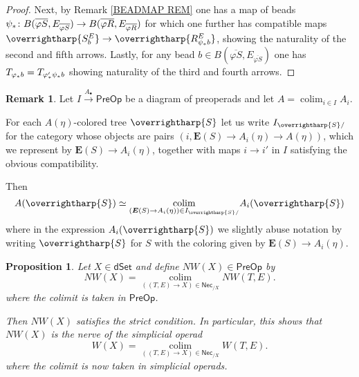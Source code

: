 \documentclass[a4paper,10pt
,draft
]{article}%
\numberwithin{equation}{section}
\numberwithin{figure}{section}
\newtheorem{proposition}[equation]{Proposition}%
\theoremstyle{definition} %
\newtheorem{remark}[equation]{Remark}%
\newcommand{\vect}[1]{\text{\overrightharp{\ensuremath{#1}}}}
\DeclareMathOperator{\colim}{colim}%
\newcommand{\1}{\ensuremath{\mathbbm 1}}%
\begin{document}
\begin{proof}
Next, by Remark \ref{BEADMAP REM}
one has a map of beads
$\psi_{\**} \colon 
B(\overline{\varphi S},E_{\overline{\varphi S}})
\to
B(\overline{\varphi R},E_{\overline{\varphi R}})$
for which one further has compatible maps
$\vect{S^{E}_b}
\to 
\vect{R^{E}_{\psi_{\**}b}}$,
showing the naturality of the second and fifth arrows.
Lastly, for any bead 
$b \in B(\overline{\varphi S},E_{\overline{\varphi S}})$
one has
$T_{\varphi_{\**}b} = T_{\varphi'_{\**} \psi_{\**}b}$
showing naturality of the third and fourth arrows.
\end{proof}




\begin{remark}\label{PREOPCOLEV REM}
	Let $I \xrightarrow{A_{\bullet}} \mathsf{PreOp}$
	be a diagram of preoperads and let
	$A = \colim_{i \in I} A_i$.
	
	For each $A(\eta)$-colored tree $\vect{S}$
	let us write
	$I_{\vect{S}/}$
	for the category whose objects are pairs
	$(i,\boldsymbol{E}(S) \to A_i(\eta) \to A(\eta))$,
	which we represent by 
	$\boldsymbol{E}(S) \to A_i(\eta)$,
	together with maps $i \to i'$ in $I$
	satisfying the obvious compatibility.
	
	Then
\[
	A(\vect{S}) \simeq 
	\underset{(\boldsymbol{E}(S) \to A_i(\eta)) \in I_{\vect{S}/}}{\colim}
	A_i(\vect{S})
\]
where in the expression $A_i(\vect{S})$
we slightly abuse notation by writing $\vect{S}$
for $S$ with the coloring given by
$\boldsymbol{E}(S) \to A_i(\eta)$.
\end{remark}





\begin{proposition}
	Let $X \in \mathsf{dSet}$ and define
	$NW(X) \in \mathsf{PreOp}$ by
\begin{equation}\label{NWKANEX EQ}
	NW(X) =
	\underset{((T,E) \to X)
	\in \mathsf{Nec}_{/X}}{\colim}
	NW(T,E).
\end{equation}
	where the colimit is taken in $\mathsf{PreOp}$.
	
	Then $NW(X)$ satisfies the strict condition.
%
	In particular, this shows that 	
	$NW(X)$ is the nerve of the simplicial operad
\[
W(X) =
\underset{((T,E) \to X)
	\in \mathsf{Nec}_{/X}}{\colim}
W(T,E).
\]
where the colimit is now taken in simplicial operads.
\end{proposition}
\end{document}
